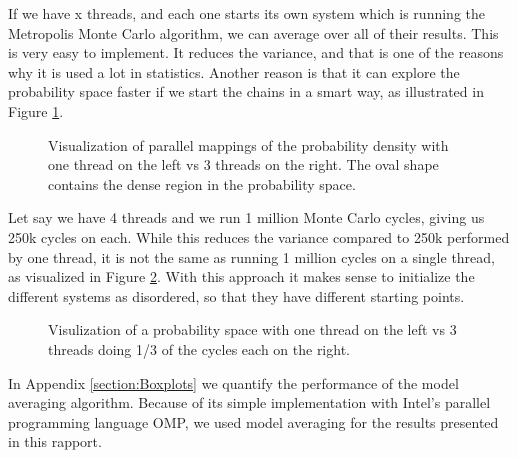 \documentclass[a4paper]{article}
\begin{document}
If we have x threads, and each one starts its own system which is running the Metropolis Monte Carlo algorithm, we can average over all of their results. This is very easy to implement. It reduces the variance, and that is one of the reasons why it is used a lot in statistics. Another reason is that it can explore the probability space faster if we start the chains in a smart way, as illustrated in Figure \ref{mother1}. 


\begin{figure}[H]

\hfill
{}
\hfill
{}
\hfill
\caption{Visualization of parallel mappings of the probability density with one thread on the left vs 3 threads on the right. The oval shape contains the dense region in the probability space.}
\label{mother1}
\end{figure}

 Let say we have 4 threads and we run 1 million Monte Carlo cycles, giving us 250k cycles on each. While this reduces the variance compared to 250k performed by one thread, it is not the same as running 1 million cycles on a single thread, as visualized in Figure \ref{mother2}. With this approach it makes sense to initialize the different systems as disordered, so that they have different starting points. 
 
\begin{figure}[H]
\hfill
{}
\hfill
{}
\hfill
\caption{Visulization of a probability space with one thread on the left vs 3 threads doing 1/3 of the cycles each on the right.}
\label{mother2}
\end{figure}

In Appendix \ref{section:Boxplots} we quantify the performance of the model averaging algorithm. Because of its simple implementation with Intel's parallel programming language OMP, we used model averaging for the results presented in this rapport.

\end{document}
